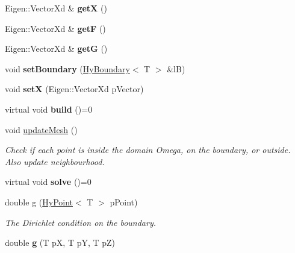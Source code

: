 \begin{DoxyCompactItemize}
\item 
\hypertarget{classHyProblem_a7fc4251c8a28039d5fc1e954420b9e8d}{
Eigen::VectorXd \& {\bfseries getX} ()}
\label{classHyProblem_a7fc4251c8a28039d5fc1e954420b9e8d}

\item 
\hypertarget{classHyProblem_a8ebd85b6c5c13d94d9f8be8041ca2507}{
Eigen::VectorXd \& {\bfseries getF} ()}
\label{classHyProblem_a8ebd85b6c5c13d94d9f8be8041ca2507}

\item 
\hypertarget{classHyProblem_a2024a50f38fd285fc60eb88a549094cb}{
Eigen::VectorXd \& {\bfseries getG} ()}
\label{classHyProblem_a2024a50f38fd285fc60eb88a549094cb}

\item 
\hypertarget{classHyProblem_abdd44294731eb686dcd5254ef7bafe74}{
void {\bfseries setBoundary} (\hyperlink{classHyBoundary}{HyBoundary}$<$ T $>$ \&lB)}
\label{classHyProblem_abdd44294731eb686dcd5254ef7bafe74}

\item 
\hypertarget{classHyProblem_ae7feccde80b8a6db481908b70d6eb24e}{
void {\bfseries setX} (Eigen::VectorXd pVector)}
\label{classHyProblem_ae7feccde80b8a6db481908b70d6eb24e}

\item 
\hypertarget{classHyProblem_a6419ca29465c86cc742efd7dba79f1b3}{
virtual void {\bfseries build} ()=0}
\label{classHyProblem_a6419ca29465c86cc742efd7dba79f1b3}

\item 
void \hyperlink{classHyProblem_a894b6467b03798221e48e1fb10ad3fcf}{updateMesh} ()
\begin{DoxyCompactList}\small\item\em Check if each point is inside the domain Omega, on the boundary, or outside. Also update neighbourhood. \item\end{DoxyCompactList}\item 
\hypertarget{classHyProblem_a4f5e62e3412d2e7b1475a8ec6a44052a}{
virtual void {\bfseries solve} ()=0}
\label{classHyProblem_a4f5e62e3412d2e7b1475a8ec6a44052a}

\item 
double \hyperlink{classHyProblem_a5d3b78c69811136e74e9fc9232cc110b}{g} (\hyperlink{classHyPoint}{HyPoint}$<$ T $>$ pPoint)
\begin{DoxyCompactList}\small\item\em The Dirichlet condition on the boundary. \item\end{DoxyCompactList}\item 
\hypertarget{classHyProblem_a14a8e72160ffe2e90664c40a53930c54}{
double {\bfseries g} (T pX, T pY, T pZ)}
\label{classHyProblem_a14a8e72160ffe2e90664c40a53930c54}


\end{DoxyCompactItemize}
